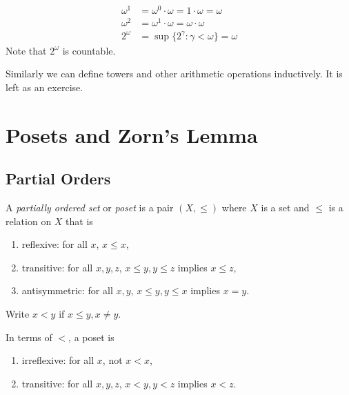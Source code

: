 \documentclass[a4paper]{article}
\begin{document}
\begin{eg}
  \begin{align*}
    \omega^1 &= \omega^0 \cdot \omega = 1 \cdot \omega = \omega \\
    \omega^2 &= \omega^1 \cdot \omega = \omega \cdot \omega \\
    2^\omega &= \sup\{2^\gamma: \gamma < \omega\} = \omega
  \end{align*}
  Note that \(2^\omega\) is countable.
\end{eg}

Similarly we can define towers and other arithmetic operations inductively. It is left as an exercise.

\section{Posets and Zorn's Lemma}

\subsection{Partial Orders}

\begin{definition}[Poset]
  A \emph{partially ordered set} or \emph{poset} is a pair \((X, \leq)\) where \(X\) is a set and \(\leq\) is a relation on \(X\) that is
  \begin{enumerate}
  \item reflexive: for all \(x\), \(x \leq x\),
  \item transitive: for all \(x, y, z\), \(x \leq y, y \leq z\) implies \(x \leq z\),
  \item antisymmetric: for all \(x, y\), \(x \leq y, y \leq x\) implies \(x = y\).
  \end{enumerate}
\end{definition}

\begin{notation}
  Write \(x < y\) if \(x \leq y, x \neq y\).

  In terms of \(<\), a poset is
  \begin{enumerate}
  \item irreflexive: for all \(x\), not \(x < x\),
  \item transitive: for all \(x, y, z\), \(x < y, y < z\) implies \(x < z\).
  \end{enumerate}
\end{notation}
\end{document}
